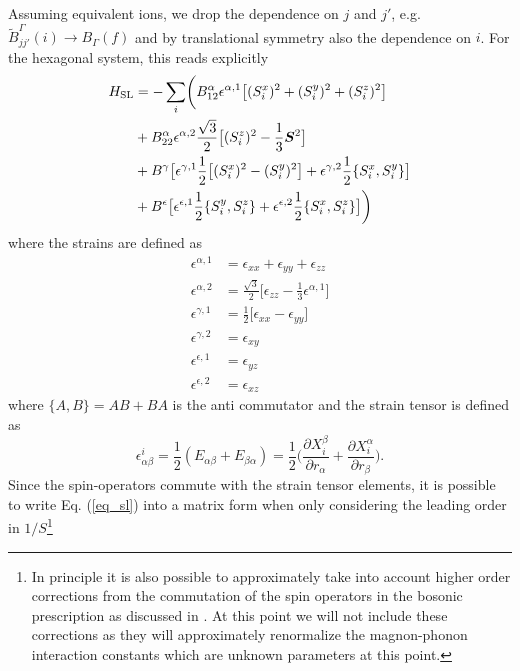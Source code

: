 \documentclass[aps,prl,twocolumn,superscriptaddress,amsmath,amssymb,floats,aps,10pt]{revtex4-1}
\begin{document}
Assuming equivalent ions, we drop the dependence on $j$ and $j'$, e.g. $\tilde B_{jj'}^\Gamma(i) \rightarrow B_\Gamma(f)$
and by translational symmetry also the dependence on $i$.
For the hexagonal system, this reads explicitly
\begin{align}
 H_{\text{SL}}&=-\sum_{i}\biggl( B_{12}^\alpha \epsilon^{\alpha,1}\bigl[(S_i^x)^2+(S_i^y)^2+(S_i^z)^2\bigr]\notag\\
 &+B_{22}^\alpha \epsilon^{\alpha,2} \frac{\sqrt{3}}{2} \bigl[(S_i^z)^2-\frac 13 \bm S^2\bigr]\notag\\
 &+B^\gamma \bigl[\epsilon^{\gamma,1} \frac 12 \bigl[(S_i^x)^2-(S_i^y)^2\bigr]+\epsilon^{\gamma,2} \frac 12 \{S_i^x,S_i^y\}\bigr]\notag\\
  &+B^\epsilon \bigl[\epsilon^{\epsilon,1} \frac 12 \{S_i^y,S_i^z\}+\epsilon^{\epsilon,2} \frac 12 \{S_i^x,S_i^z\}\bigr]\biggr)\label{eq_sl}
\end{align}
where the strains are defined as
\begin{subequations}
 \begin{align}
  \epsilon^{\alpha,1}&=\epsilon_{xx}+\epsilon_{yy}+\epsilon_{zz}\\
  \epsilon^{\alpha,2}&=\frac{\sqrt{3}}{2}\bigl[\epsilon_{zz}-\frac 1 3 \epsilon^{\alpha,1}\bigr]\\
  \epsilon^{\gamma,1}&=\frac 12 \bigl[\epsilon_{xx}-\epsilon_{yy}\bigr]\\
  \epsilon^{\gamma,2}&=\epsilon_{xy}\\
  \epsilon^{\epsilon,1}&=\epsilon_{yz}\\
  \epsilon^{\epsilon,2}&=\epsilon_{xz}\,
 \end{align}
\end{subequations}
where $\{A,B\}=AB+BA$ is the anti commutator and the strain tensor is defined as
\begin{equation}
 \epsilon_{\alpha\beta}^i=\frac 12 (E_{\alpha\beta}+E_{\beta\alpha})=\frac 12 \biggl(\frac{\partial X_i^\beta}{\partial r_\alpha}+\frac{\partial X_i^\alpha}{\partial r_\beta}\biggr).
 \label{eq_strain}
\end{equation}
Since the spin-operators commute with the strain tensor elements, it is possible to write Eq. (\ref{eq_sl}) into a matrix form when only considering the leading order in $1/S$\footnote{In principle it is also possible to approximately take into account higher order corrections from the commutation of the spin operators in the bosonic prescription as discussed in \cite{Jensen_risoe}. At this point we will not include these corrections as they will approximately renormalize the magnon-phonon interaction constants which are unknown parameters at this point.}
\end{document}
